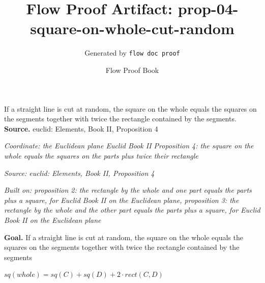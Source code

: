 \documentclass[11pt]{article}
\title{Flow Proof Artifact: prop-04-square-on-whole-cut-random}
\author{Generated by \texttt{flow doc proof}}
\date{Flow Proof Book}
\theoremstyle{definition}
\begin{document}
\maketitle
If a straight line is cut at random, the square on the whole equals the squares on the segments together with twice the rectangle contained by the segments.\\[0.5em]
\textbf{Source.} euclid: Elements, Book II, Proposition 4\\[0.5em]
\bigskip
{}\par
\smallskip\noindent\textit{Coordinate: the Euclidean plane \cdot Euclid Book II \cdot Proposition 4: the square on the whole equals the squares on the parts plus twice their rectangle}\par
\smallskip\noindent\textit{Source: euclid: Elements, Book II, Proposition 4}\par
\smallskip\noindent\textit{Built on: proposition 2: the rectangle by the whole and one part equals the parts plus a square, for Euclid Book II on the Euclidean plane, proposition 3: the rectangle by the whole and the other part equals the parts plus a square, for Euclid Book II on the Euclidean plane}\par
\medskip
\noindent\textbf{Goal.} If a straight line is cut at random, the square on the whole equals the squares on the segments together with twice the rectangle contained by the segments\par
\noindent$\displaystyle sq(whole) = sq(C) + sq(D) + 2 \cdot rect(C, D)$\par
\medskip
\noindent
\end{document}
